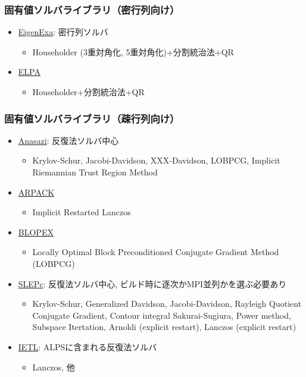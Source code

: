 \begin{frame}
  \frametitle{固有値ソルバライブラリ（密行列向け）}
  \begin{itemize}
  \item \href{http://www.aics.riken.jp/labs/lpnctrt/EigenExa.html}{EigenExa}: 密行列ソルバ
    \begin{itemize}
      \item Householder (3重対角化, 5重対角化)+分割統治法+QR
    \end{itemize}
  \item \href{http://elpa.rzg.mpg.de}{ELPA}
    \begin{itemize}
      \item Householder+分割統治法+QR
    \end{itemize}
  \end{itemize}
\end{frame}

\begin{frame}
  \frametitle{固有値ソルバライブラリ（疎行列向け）}
  \begin{itemize}
  \item \href{http://trilinos.org/packages/anasazi/}{Anasazi}: 反復法ソルバ中心
    \begin{itemize}
      \item Krylov-Schur, Jacobi-Davidson, XXX-Davidson, LOBPCG, Implicit Riemannian Trust Region Method
    \end{itemize}
  \item \href{http://www.caam.rice.edu/software/ARPACK/}{ARPACK}
    \begin{itemize}
      \item Implicit Restarted Lanczos
    \end{itemize}
  \item \href{https://code.google.com/p/blopex/}{BLOPEX}
    \begin{itemize}
    \item Locally Optimal Block Preconditioned Conjugate Gradient Method (LOBPCG)
    \end{itemize}
  \item \href{http://www.grycap.upv.es/slepc/}{SLEPc}: 反復法ソルバ中心, ビルド時に逐次かMPI並列かを選ぶ必要あり
    \begin{itemize}
      \item Krylov-Schur, Generalized Davidson, Jacobi-Davidson, Rayleigh Quotient Conjugate Gradient, Contour integral Sakurai-Sugiura, Power method, Subspace Itertation, Arnoldi (explicit restart), Lanczos (explicit restart) \\
    \end{itemize}
  \item \href{http://www.comp-phys.org/software/ietl/}{IETL}: ALPSに含まれる反復法ソルバ
    \begin{itemize}
      \item Lanczos, 他
    \end{itemize}
  \end{itemize}
\end{frame}


